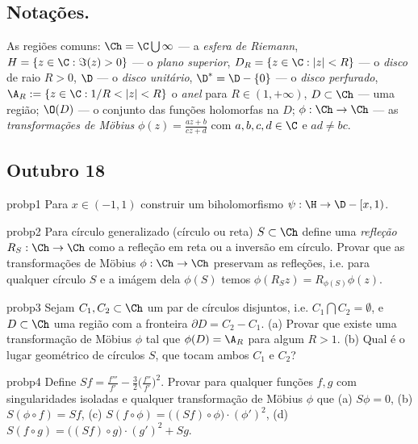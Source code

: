 \subsection*{Notações.}
As regiões comuns:
$\Ch = \C \bigcup \infty$ --- a \emph{esfera de Riemann},
$H = \{z\in\C: \Im(z)>0\}$ --- o \emph{plano superior},
$D_R = \{z\in\C: |z|<R\}$ --- o \emph{disco} de raio $R>0$,
$\D$ --- o \emph{disco unitário},
$\D^* = \D - \{0\}$ --- o \emph{disco perfurado},
$\A_R := \{z\in\C: 1/R < |z| < R \}$ o \emph{anel} para $R\in(1,+\infty)$,
$D\subset \Ch$ --- uma região;
$\O(D)$ --- o conjunto das funções holomorfas na $D$;
$\phi : \Ch\to\Ch$ --- as \emph{transformações de Möbius} 
$\phi(z) = \frac{az+b}{cz+d}$
com $a,b,c,d\in\C$ e $ad\neq bc$.

\subsection{Outubro 18}

\begin{restatable}{prob}{p1}\label{p1} %
Para $x\in(-1,1)$
construir um biholomorfismo %
$\psi: \H \to \D - [x,1)$.
\end{restatable}

\begin{restatable}{prob}{p2}\label{p2} %
Para círculo generalizado (círculo ou reta) $S \subset \Ch$ define
uma \emph{refleção}
$R_S : \Ch \to \Ch$ como a refleção em reta ou a inversão em círculo.
Provar que as transformações de Möbius $\phi : \Ch\to\Ch$
preservam as refleções, i.e. para qualquer
círculo $S$ e a imágem dela $\phi(S)$ temos $\phi(R_S z) = R_{\phi(S)} \phi(z)$.
\end{restatable}

\begin{restatable}{prob}{p3}\label{p3} %
Sejam $C_1,C_2 \subset \Ch$ um par de círculos disjuntos, i.e. $C_1 \bigcap C_2 = \emptyset$,
e $D \subset \Ch$ uma região com a fronteira $\partial D = C_2 - C_1$.
(a) Provar que existe uma transformação de Möbius $\phi$ tal que
$\phi(D) = \A_R$ para algum $R>1$. %
(b) Qual é o lugar geométrico de círculos $S$, que tocam ambos $C_1$ e $C_2$?
\end{restatable}

\begin{restatable}{prob}{p4}\label{p4} %
Define $Sf = \frac{f'''}{f'} - \frac{3}{2} \big(\frac{f''}{f'}\big)^2$.
Provar para qualquer funções $f,g$ com singularidades isoladas e qualquer
transformação de Möbius $\phi$ que
(a) $S \phi = 0$,
(b) $S (\phi \circ f) = S f$,
(c) $S(f \circ \phi) = \big((Sf)\circ\phi\big) \cdot (\phi')^2$,
(d) $S(f\circ g) = \big((Sf)\circ g\big) \cdot (g')^2 + Sg$.
\end{restatable}

